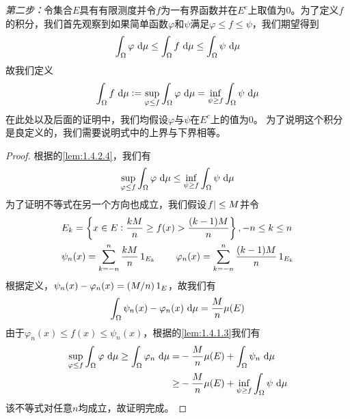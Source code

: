 \documentclass[../main.tex]{subfiles}
\begin{document}
\textit{第二步：}令集合\(E\)具有有限测度并令\(f\)为一有界函数并在\(E^c\)上取值为\(0\)。为了定义\(f\)的积分，我们首先观察到如果简单函数\(\varphi\)和\(\psi\)满足\(\varphi\leq f\leq\psi\)，我们期望得到
\[\int_\Omega\varphi\,\dif\mu\leq\int_\Omega f\,\dif\mu\leq\int_\Omega\psi\,\dif\mu\]
故我们定义
\begin{equation}
	\int_\Omega f\,\dif\mu:=\sup_{\varphi\leq f}\int_\Omega\varphi\,\dif\mu=\inf_{\psi\geq f}\int_\Omega\psi\,\dif\mu
\end{equation}
在此处以及后面的证明中，我们均假设\(\varphi\)与\(\psi\)在\(E^c\)上的值为\(0\)。
为了说明这个积分是良定义的，我们需要说明式中的上界与下界相等。
\begin{proof}
根据的\ref{lem:1.4.2.4}，我们有
\[\sup_{\varphi\leq f}\int_\Omega\varphi\,\dif\mu\leq\inf_{\psi\geq f}\int_\Omega\psi\,\dif\mu\]
为了证明不等式在另一个方向也成立，我们假设\(\envert{f}\leq M\)并令
\begin{align*}
	&E_k=\cbr{x\in E:\frac{kM}{n}\geq f(x)>\frac{(k-1)M}{n}}, -n\leq k\leq n\\
	&\psi_n(x)=\sum_{k=-n}^n\frac{kM}{n}\indicator_{E_k}\qquad\varphi_n(x)=\sum_{k=-n}^n\frac{(k-1)M}{n}\indicator_{E_k}
\end{align*}
根据定义，\(\psi_n(x)-\varphi_n(x)=(M/n)\operatorname{1}_{E}\)，故我们有
\[\int_\Omega\psi_n(x)-\varphi_n(x)\,\dif\mu=\frac{M}{n}\mu(E)\]
由于\(\varphi_n(x)\leq f(x)\leq\psi_n(x)\)，根据的\ref{lem:1.4.1.3}我们有
\[\begin{split}
	\sup_{\varphi\leq f}\int_\Omega\varphi\,\dif\mu\geq\int_\Omega\varphi_n\,\dif\mu=&-\frac{M}{n}\mu(E)+\int_\Omega\psi_n\,\dif\mu\\
	\geq&-\frac{M}{n}\mu(E)+\inf_{\psi\geq f}\int_\Omega\psi\,\dif\mu
\end{split}\]
该不等式对任意\(n\)均成立，故证明完成。
\end{proof}
\end{document}
